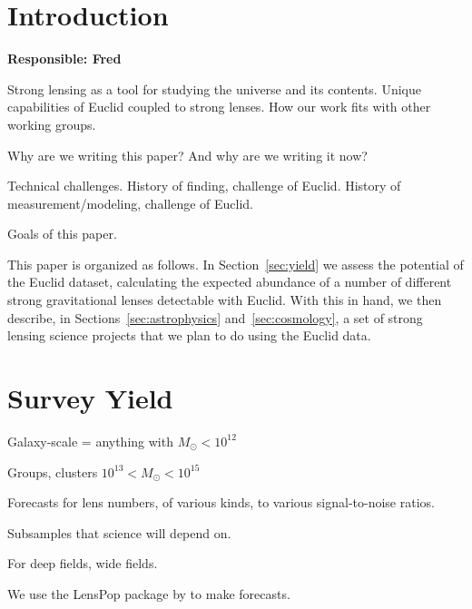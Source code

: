\documentclass[twocolumn]{svjour3}
\begin{document}

\section{Introduction}

{\bf Responsible: Fred}

Strong lensing as a tool for studying the universe and its contents.
Unique capabilities of Euclid coupled to strong lenses. How our  work
fits with other working groups.

Why are we writing this paper? And why are we writing it now?

Technical challenges. History of finding, challenge of Euclid. History
of  measurement/modeling, challenge of Euclid.

Goals of this paper.

This paper is organized as follows. In Section~\ref{sec:yield} we assess
the  potential of the Euclid dataset, calculating the expected abundance
of a  number of different strong gravitational lenses detectable with
Euclid. With  this in hand, we then  describe, in
Sections~\ref{sec:astrophysics} and~\ref{sec:cosmology}, a set  of
strong lensing science projects that we plan to do using the Euclid
data.


\section{Survey Yield}



Galaxy-scale = anything with $ M_{\odot} < 10^{12}$

Groups, clusters $ 10^{13}< M_{\odot} < 10^{15}$

Forecasts for lens numbers, of various kinds, to various signal-to-noise ratios.

Subsamples that science will depend on.

For deep fields, wide fields.

We use the {\sc LensPop} package by \citet{Collett2015} to make
forecasts.

\end{document}
